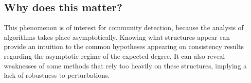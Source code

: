 \documentclass[../../main.tex]{subfiles} %
\begin{document}
\subsection{Why does this matter?}  %
This phenomenon is of interest for community detection, because the analysis 
of algorithms takes place asymptotically. Knowing what structures appear can 
provide an intuition to the common hypotheses appearing on consistency 
results regarding the asymptotic regime of the expected degree. It can also 
reveal weaknesses of some methods that rely too heavily on these structures, 
implying a lack of robustness to perturbations.

\end{document}
